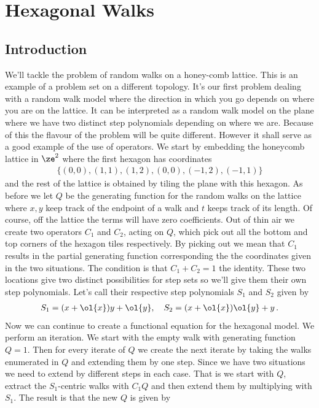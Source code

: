 
\chapter{Hexagonal Walks}
\label{ch:Hexagonal}

\section{Introduction}

We'll tackle the problem of random walks on a honey-comb lattice. This is an example of a problem set on a different topology. It's our first problem dealing with a random walk model where the direction in which you go depends on where you are on the lattice. It can be interpreted as a random walk model on the plane where we have two distinct step polynomials depending on where we are. Because of this the flavour of the problem will be quite different. However it shall serve as a good example of the use of operators. We start by embedding the honeycomb lattice in $\ze^2$ where the first hexagon has coordinates
\begin{align}
	\{(0,0),(1,1),(1,2),(0,0),(-1,2),(-1,1)\}
\end{align}
and the rest of the lattice is obtained by tiling the plane with this hexagon. As before we let $Q$ be the generating function for the random walks on the lattice where $x,y$ keep track of the endpoint of a walk and $t$ keeps track of its length. Of course, off the lattice the terms will have zero coefficients. Out of thin air we create two operators $C_1$ and $C_2$, acting on $Q$, which pick out all the bottom and top corners of the hexagon tiles respectively. By picking out we mean that $C_1$ results in the partial generating function corresponding the the coordinates given in the two situations. The condition is that $C_1+C_2 = 1$ the identity. These two locations give two distinct possibilities for step sets so we'll give them their own step polynomials. Let's call their respective step polynomials $S_1$ and $S_2$ given by
\begin{align}
	S_1 = (x+\ol{x})y + \ol{y},\quad S_2 = (x+\ol{x})\ol{y}+y\,.
\end{align}
Now we can continue to create a functional equation for the hexagonal model. We perform an iteration. We start with the empty walk with generating function $Q = 1$. Then for every iterate of $Q$ we create the next iterate by taking the walks enumerated in $Q$ and extending them by one step. Since we have two situations we need to extend by different steps in each case. That is we start with $Q$, extract the $S_1$-centric walks with $C_1Q$ and then extend them by multiplying with $S_1$. The result is that the new $Q$ is given by
